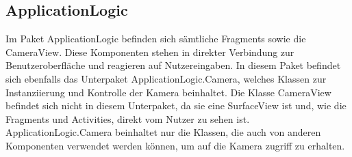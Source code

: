\label{app:module:applicationlogic}\subsection{ApplicationLogic}
Im Paket ApplicationLogic befinden sich sämtliche Fragments sowie die CameraView. Diese Komponenten stehen in direkter Verbindung zur Benutzeroberfläche und reagieren auf Nutzereingaben. In diesem Paket befindet sich ebenfalls das Unterpaket ApplicationLogic.Camera, welches Klassen zur Instanziierung und Kontrolle der Kamera beinhaltet. Die Klasse CameraView befindet sich nicht in diesem Unterpaket, da sie eine SurfaceView ist und, wie die Fragments und Activities, direkt vom Nutzer zu sehen ist. ApplicationLogic.Camera beinhaltet nur die Klassen, die auch von anderen Komponenten verwendet werden können, um auf die Kamera zugriff zu erhalten.
